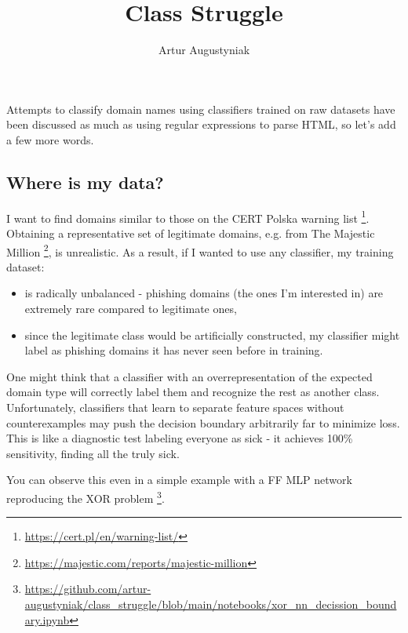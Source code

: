 \documentclass[twocolumn,9pt]{extarticle}
\title{Class Struggle}
\author{Artur Augustyniak}
\makeatletter
\renewcommand{\maketitle}{
\begin{flushleft}
{\noindent\Huge\bf\@title}\break
\end{flushleft}
}
\makeatother
\begin{document}
\maketitle

Attempts to classify domain names using classifiers trained on raw datasets have been discussed as much as using regular expressions to parse HTML, so let’s add a few more words.

\vspace{-9pt}
\subsection*{Where is my data?}
\vspace{-6pt}

I want to find domains similar to those on the CERT Polska warning list \footnote{\url{https://cert.pl/en/warning-list/}}.
Obtaining a representative set of legitimate domains, e.g. from The Majestic Million \footnote{\url{https://majestic.com/reports/majestic-million}}, is unrealistic.
As a result, if I wanted to use any classifier, my training dataset:
\begin{itemize}
  \item is radically unbalanced - phishing domains (the ones I'm interested in) are extremely rare compared to legitimate ones,
  \item since the legitimate class would be artificially constructed, my classifier might label as phishing domains it has never seen before in training.
\end{itemize}

One might think that a classifier with an overrepresentation of the expected domain type will correctly label them and recognize the rest as another class.
Unfortunately, classifiers that learn to separate feature spaces without counterexamples may push the decision boundary arbitrarily far to minimize loss.
This is like a diagnostic test labeling everyone as sick - it achieves 100\% sensitivity, finding all the truly sick.

You can observe this even in a simple example with a FF MLP network reproducing the XOR problem \footnote{\url{https://github.com/artur-augustyniak/class_struggle/blob/main/notebooks/xor_nn_decission_boundary.ipynb}}.
\end{document}
